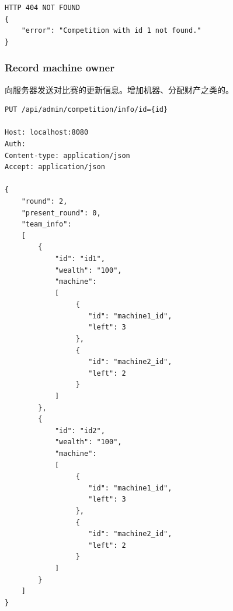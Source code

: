 \documentclass[12pt, a4paper,UTF8]{article}
\begin{document}
\begin{lstlisting}
HTTP 404 NOT FOUND
{
    "error": "Competition with id 1 not found."
}
\end{lstlisting}

\subsubsection{Record machine owner}
向服务器发送对比赛的更新信息。增加机器、分配财产之类的。

\begin{lstlisting}
PUT /api/admin/competition/info/id={id}

Host: localhost:8080
Auth:
Content-type: application/json
Accept: application/json

{
    "round": 2,
    "present_round": 0,
    "team_info":
    [
        {
            "id": "id1",
            "wealth": "100",
            "machine":
            [
                 {
                    "id": "machine1_id",
                    "left": 3
                 },
                 {
                    "id": "machine2_id",
                    "left": 2
                 }
            ]
        },
        {
            "id": "id2",
            "wealth": "100",
            "machine":
            [
                 {
                    "id": "machine1_id",
                    "left": 3
                 },
                 {
                    "id": "machine2_id",
                    "left": 2
                 }
            ]
        }
    ]
}
\end{lstlisting}
\end{document}
